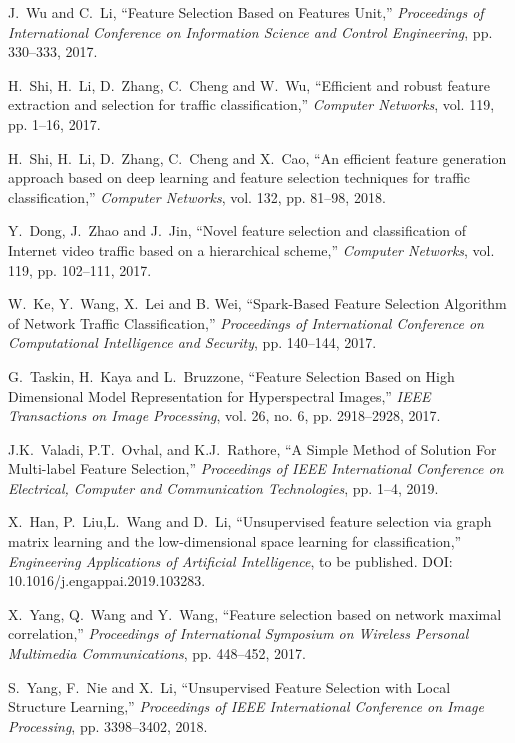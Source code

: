 \documentclass{ieeeaccess}
\theoremstyle{definition}
\begin{document}
\begin{thebibliography}{1}
    J.~Wu and C.~Li, ``Feature Selection Based on Features Unit,'' \emph{Proceedings of International Conference on Information Science and Control Engineering}, pp. 330--333, 2017.

    H.~Shi, H.~Li, D.~Zhang, C.~Cheng and W.~Wu, ``Efficient and robust feature extraction and selection for traffic classification,'' \emph{Computer Networks}, vol. 119, pp. 1--16, 2017.

    H.~Shi, H.~Li, D.~Zhang, C.~Cheng and X.~Cao, ``An efficient feature generation approach based on deep learning and feature selection techniques for traffic classification,'' \emph{Computer Networks}, vol. 132, pp. 81--98, 2018.

    Y.~Dong, J.~Zhao and J.~Jin, ``Novel feature selection and classification of Internet video traffic based on a hierarchical scheme,'' \emph{Computer Networks}, vol. 119, pp. 102--111, 2017.

    W.~Ke, Y.~Wang, X.~Lei and B. Wei, ``Spark-Based Feature Selection Algorithm of Network Traffic Classification,'' \emph{Proceedings of International Conference on Computational Intelligence and Security}, pp. 140--144, 2017.

    G.~Taskin, H.~Kaya and L.~Bruzzone, ``Feature Selection Based on High Dimensional Model Representation for Hyperspectral Images,'' \emph{IEEE Transactions on Image Processing}, vol. 26, no. 6, pp. 2918--2928, 2017.

    J.K.~Valadi, P.T.~Ovhal, and K.J.~Rathore, ``A Simple Method of Solution For Multi-label Feature Selection,'' \emph{Proceedings of IEEE International Conference on Electrical, Computer and Communication Technologies}, pp. 1--4, 2019.

    X.~Han, P.~Liu,L.~Wang and D.~Li, ``Unsupervised feature selection via graph matrix learning and the low-dimensional space learning for classification,'' \emph{Engineering Applications of Artificial Intelligence}, to be published. DOI: 10.1016/j.engappai.2019.103283.

    X.~Yang, Q.~Wang and Y.~Wang, ``Feature selection based on network maximal correlation,'' \emph{Proceedings of International Symposium on Wireless Personal Multimedia Communications}, pp. 448--452, 2017.

    S.~Yang, F.~Nie and X.~Li, ``Unsupervised Feature Selection with Local Structure Learning,'' \emph{Proceedings of IEEE International Conference on Image Processing}, pp. 3398--3402, 2018.


\end{thebibliography}
\end{document}
